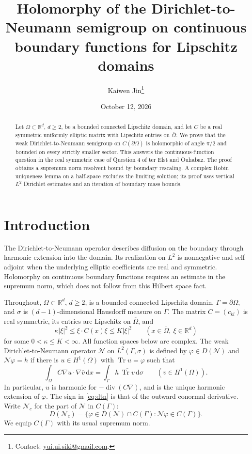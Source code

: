 \documentclass[11pt]{article}
\title{Holomorphy of the Dirichlet-to-Neumann semigroup\newline
on continuous boundary functions for Lipschitz domains}
\author{Kaiwen Jin\thanks{Contact: \href{mailto:yui.ui.siki@gmail.com}{yui.ui.siki@gmail.com}.}}
\date{October 12, 2026}
\newcommand{\R}{\mathbb R}
\newcommand{\Tr}{\operatorname{Tr}}
\newcommand{\diver}{\operatorname{div}}
\newcommand{\Nc}{\mathcal N_c}
\newcommand{\N}{\mathcal N}
\newcommand{\dd}{\,\mathrm d}
\newcommand{\abs}[1]{\lvert #1\rvert}
\begin{document}
\maketitle
\begin{abstract}
Let $\Omega\subset\R^d$, $d\geq2$, be a bounded connected Lipschitz domain,
and let $C$ be a real symmetric uniformly elliptic matrix with Lipschitz
entries on $\overline\Omega$. We prove that the weak Dirichlet-to-Neumann
semigroup on $C(\partial\Omega)$ is holomorphic of angle $\pi/2$ and bounded
on every strictly smaller sector. This answers the continuous-function
question in the real symmetric case of Question 4 of ter Elst and Ouhabaz.
The proof obtains a supremum norm resolvent bound by boundary rescaling.
A complex Robin uniqueness lemma on a half-space excludes the limiting
solution; its proof uses vertical $L^2$ Dirichlet estimates and an iteration
of boundary mass bounds.
\end{abstract}

\section{Introduction}

The Dirichlet-to-Neumann operator describes diffusion on the boundary through
harmonic extension into the domain. Its realization on $L^2$ is nonnegative
and self-adjoint when the underlying elliptic coefficients are real and
symmetric. Holomorphy on continuous boundary functions requires an estimate
in the supremum norm, which does not follow from this Hilbert space fact.

Throughout, $\Omega\subset\R^d$, $d\geq2$, is a bounded connected Lipschitz
domain, $\Gamma=\partial\Omega$, and $\sigma$ is $(d-1)$-dimensional Hausdorff
measure on $\Gamma$. The matrix $C=(c_{kl})$ is real symmetric, its entries
are Lipschitz on $\overline\Omega$, and
\begin{equation}\label{eq:elliptic}
 \kappa\abs\xi^2\leq \xi\cdot C(x)\xi\leq K\abs\xi^2
 \qquad(x\in\overline\Omega,\ \xi\in\R^d)
\end{equation}
for some $0<\kappa\leq K<\infty$. All function spaces below are complex.
The weak Dirichlet-to-Neumann operator $\N$ on $L^2(\Gamma,\sigma)$ is defined
by $\varphi\in D(\N)$ and $\N\varphi=h$ if there is $u\in H^1(\Omega)$ with
$\Tr u=\varphi$ such that
\begin{equation}\label{eq:dtn}
 \int_\Omega C\nabla u\cdot\nabla\overline v\dd x
   =\int_\Gamma h\,\overline{\Tr v}\dd\sigma
 \qquad(v\in H^1(\Omega)).
\end{equation}
In particular, $u$ is harmonic for $-\diver(C\nabla)$, and is the unique
harmonic extension of $\varphi$. The sign in \eqref{eq:dtn} is that of the
outward conormal derivative. Write $\Nc$ for the part of $\N$ in
$C(\Gamma)$:
\[
 D(\Nc)=\{\varphi\in D(\N)\cap C(\Gamma):\N\varphi\in C(\Gamma)\}.
\]
We equip $C(\Gamma)$ with its usual supremum norm.
\end{document}
